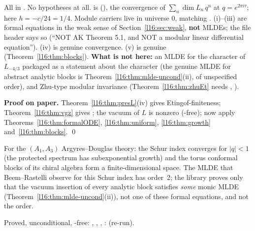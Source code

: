 \begin{dictionary}
All in . No hypotheses at all.  is
 (),
the convergence of $\sum_n\dim L_n\,q^n$ at $q = e^{2\pi i\tau}$; here $h = -c/24 = 1/4$. Module carriers  live in
universe $0$, matching . (i)--(iii) are formal equations in the weak sense of Section~\ref{l16:sec:weak},
\textbf{not} MLDEs; the file header says so (``NOT AK Theorem 5.1, and NOT a modular linear differential equation''). (iv)
is genuine convergence. (v) is genuine (Theorem~\ref{l16:thm:blocks}). \textbf{What is not here:} an MLDE for the character
of $L_{-4/3}$ packaged as a statement about the character (the genuine MLDE for abstract analytic blocks is
Theorem~\ref{l16:thm:mlde-uncond}(ii), of unspecified order), and Zhu-type modular
invariance (Theorem~\ref{l16:thm:zhuEt} needs , ).
\end{dictionary}

\textbf{Proof on paper.} Theorem~\ref{l16:thm:presL}(iv) gives Etingof-finiteness; Theorem~\ref{l16:thm:vgz} gives
; the vacuum of $L$ is nonzero (-free); now apply Theorems~\ref{l16:thm:formalODE},
\ref{l16:thm:uniform}, \ref{l16:thm:growth} and~\ref{l16:thm:blocks}. \qed

\begin{physics}
For the $(A_1,A_3)$ Argyres--Douglas theory: the Schur index converges for $|q|<1$ (the protected spectrum has subexponential
growth) and the torus conformal blocks of its chiral algebra form a finite-dimensional space. The MLDE that Beem--Rastelli
observe for this Schur index has order~2; the library proves only that the vacuum insertion of every analytic block satisfies
\emph{some} monic MLDE (Theorem~\ref{l16:thm:mlde-uncond}(ii)), not one of these formal equations, and not the order.
\end{physics}

\begin{status}
Proved, unconditional, -free: \allowbreak{}\allowbreak{}\allowbreak{}\allowbreak{},
\allowbreak{}\allowbreak{}\allowbreak{}\allowbreak{}, \allowbreak{}\allowbreak{},
\allowbreak{}\allowbreak{}: \lean{[propext, Classical.}\allowbreak{}\allowbreak\lean{sound]} (re-run).
\end{status}

